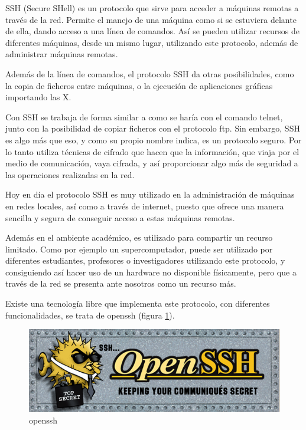     SSH (Secure SHell) es un protocolo que sirve para acceder a máquinas
    remotas a través de la red. Permite el manejo de una máquina como si se
    estuviera delante de ella, dando acceso a una línea de comandos. Así se
    pueden utilizar recursos de diferentes máquinas, desde un mismo lugar,
    utilizando este protocolo, además de administrar máquinas remotas.

    Además de la línea de comandos, el protocolo SSH da otras
    posibilidades, como la copia de ficheros entre máquinas, o la ejecución
    de aplicaciones gráficas importando las X.

    Con SSH se trabaja de forma similar a como se haría con el comando
    telnet, junto con la posibilidad de copiar ficheros con el protocolo
    ftp. Sin embargo, SSH es algo más que eso, y como su propio nombre
    indica, es un protocolo seguro. Por lo tanto utiliza técnicas de
    cifrado que hacen que la información, que viaja por el medio de
    comunicación, vaya cifrada, y así proporcionar algo más de seguridad a
    las operaciones realizadas en la red.

    Hoy en día el protocolo SSH es muy utilizado en la administración de
    máquinas en redes locales, así como a través de internet, puesto que
    ofrece una manera sencilla y segura de conseguir acceso a estas
    máquinas remotas.

    Además en el ambiente académico, es utilizado para compartir un recurso
    limitado. Como por ejemplo un supercomputador, puede ser utilizado por
    diferentes estudiantes, profesores o investigadores utilizando este
    protocolo, y consiguiendo así hacer uso de un hardware no disponible
    físicamente, pero que a través de la red se presenta ante nosotros como
    un recurso más.

    Existe una tecnología libre que implementa este protocolo, con
    diferentes funcionalidades, se trata de openssh (figura
    \ref{fig:openssh}).

    \begin{figure}[htp!]
        \centering
            \includegraphics[width=\textwidth]{img/openssh.png}
            \caption{openssh}
        \label{fig:openssh}
    \end{figure}

